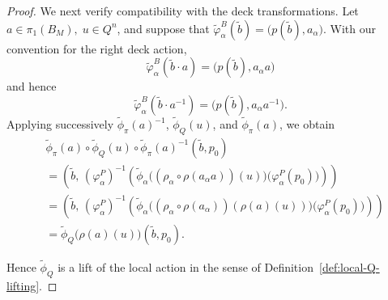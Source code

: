 \documentclass[11pt,a4paper]{article}
\numberwithin{equation}{section}
\theoremstyle{named}
\begin{document}
\begin{proof}
We next verify compatibility with the deck transformations. Let $a\in\pi_1(B_M),\;
u\in Q^n$,
and suppose that $\widetilde\varphi_\alpha^B(\widetilde b)
=
\bigl(p(\widetilde b),a_\alpha\bigr)$.
With our convention for the right deck action,
\[
\widetilde\varphi_\alpha^B(\widetilde b\cdot a)
=
\bigl(p(\widetilde b),a_\alpha a\bigr)
\]
and hence
\[
\widetilde\varphi_\alpha^B(\widetilde b\cdot a^{-1})
=
\bigl(p(\widetilde b),a_\alpha a^{-1}\bigr).
\]
Applying successively
\(\widetilde\phi_\pi(a)^{-1}\),
\(\widetilde\phi_Q(u)\), and
\(\widetilde\phi_\pi(a)\), we obtain
\begin{align*}
&
\widetilde\phi_\pi(a)\circ
\widetilde\phi_Q(u)\circ
\widetilde\phi_\pi(a)^{-1}
(\widetilde b,p_0)
\\
&=
\left(
\widetilde b,\,
(\varphi_\alpha^P)^{-1}
\left(
\widetilde\phi_\alpha
\bigl(
(\rho_\alpha\circ\rho(a_\alpha a))(u)
\bigr)
\bigl(\varphi_\alpha^P(p_0)\bigr)
\right)
\right)
\\
&=
\left(
\widetilde b,\,
(\varphi_\alpha^P)^{-1}
\left(
\widetilde\phi_\alpha
\bigl(
(\rho_\alpha\circ\rho(a_\alpha))
(\rho(a)(u))
\bigr)
\bigl(\varphi_\alpha^P(p_0)\bigr)
\right)
\right)
\\
&=
\widetilde\phi_Q\bigl(\rho(a)(u)\bigr)
(\widetilde b,p_0).
\end{align*}

Hence \(\widetilde\phi_Q\) is a lift of the local action in the sense of Definition~\ref{def:local-Q-lifting}.


\end{proof}
\end{document}
